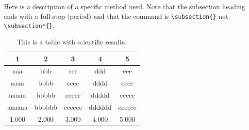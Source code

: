 \documentclass[%
showpacs,
 amsmath,amssymb,
 aps,
 twocolumn,
 prl,
 reprint,
floatfix,
]{revtex4-1}
\begin{document}
Here is a description of a specific method used.  Note that the
subsection heading ends with a full stop (period) and that the
command is \verb|\subsection{}| not \verb|\subsection*{}|.




%





\begin{table}
\centering
\caption{This is a table with scientific results.}
\medskip
\begin{tabular}{ccccc}
\hline
1 & 2 & 3 & 4 & 5\\
\hline
aaa & bbb & ccc & ddd & eee\\
aaaa & bbbb & cccc & dddd & eeee\\
aaaaa & bbbbb & ccccc & ddddd & eeeee\\
aaaaaa & bbbbbb & cccccc & dddddd & eeeeee\\
1.000 & 2.000 & 3.000 & 4.000 & 5.000\\
\hline
\end{tabular}
\end{table}


\end{document}
